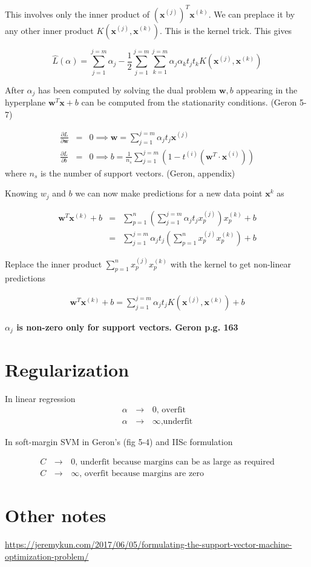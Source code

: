 \documentclass{article}
\newcommand{\beq}{\begin{equation}}
\newcommand{\eeq}{\end{equation}}
\newcommand{\ber}{\begin{eqnarray}}
\newcommand{\eer}{\end{eqnarray}}
\newcommand{\pdd}[2]{\frac{\partial{#1}}{\partial{#2}}}
\begin{document}
This involves only the inner product of $(\pmb{x}^{(j)})^T\pmb{x}^{(k)}$. We can preplace it by any other inner product $K(\pmb{x}^{(j)},\pmb{x}^{(k)})$. This is the kernel trick. This gives

\beq
\hat{L}(\alpha) = \sum_{j=1}^{j=m}\alpha_j - \frac{1}{2}\sum_{j=1}^{j=m}\sum_{k=1}^{j=m}\alpha_j\alpha_kt_jt_kK(\pmb{x}^{(j)},\pmb{x}^{(k)})
\eeq

After $\alpha_j$ has been computed by solving the dual problem $\pmb{w},b$ appearing in the hyperplane $\pmb{w}^{T}\pmb{x} + b$ can be computed from the stationarity conditions.
(Geron 5-7)

\ber
\pdd{L}{\pmb{w}} &=& 0 \implies \pmb{w} = \sum_{j=1}^{j=m} \alpha_j t_j \pmb{x}^{(j)} \\
\pdd{L}{b}  &=& 0 \implies b = \frac{1}{n_s}\sum_{j=1}^{j=m} (1-t^{(i)}(\pmb{w}^T\cdot\pmb{x}^{(i)}))
\eer
where $n_s$ is the number of support vectors. (Geron, appendix)

Knowing $w_j$ and $b$ we can now make predictions for a new data point $\pmb{x}^{k}$ as 

\ber
\pmb{w}^T{\pmb{x}^{(k)}} + b &=& \sum_{p=1}^{n}(\sum_{j=1}^{j=m} \alpha_j t_j x_p^{(j)})x^{(k)}_{p} + b \\
&=& \sum_{j=1}^{j=m}  \alpha_j t_j ( \sum_{p=1}^{n}x_p^{(j)}x^{(k)}_{p}) + b
\eer

Replace the inner product $\sum_{p=1}^{n}x_p^{(j)}x^{(k)}_{p}$ with the kernel to get non-linear predictions

\ber
\pmb{w}^T{\pmb{x}^{(k)}} + b = \sum_{j=1}^{j=m}  \alpha_j t_j K(\pmb{x}^{(j)},\pmb{x}^{(k)}) + b
\eer

\textbf{$\alpha_j$ is non-zero only for support vectors. Geron p.g. 163}

\section{ Regularization }

In linear regression
\ber
\alpha\,&\rightarrow&\,{0} \text{, overfit }\\
\alpha\,&\rightarrow&\,{\infty} \text{,underfit}
\eer

In soft-margin SVM in Geron's (fig 5-4) and IISc formulation

\ber
C\,&\rightarrow&\,{0} \text{, underfit because margins can be as large as required} \\
C\,&\rightarrow&\,{\infty} \text{, overfit because margins are zero} 
\eer

\section{Other notes}
\url{https://jeremykun.com/2017/06/05/formulating-the-support-vector-machine-optimization-problem/}
\end{document}
